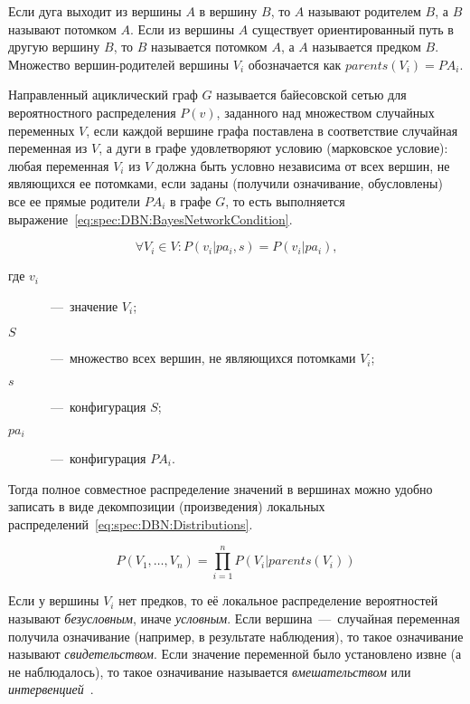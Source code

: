 Если дуга выходит из вершины $A$ в вершину $B$, то $A$ называют родителем $B$, а $B$ называют потомком $A$. Если из вершины $A$ существует ориентированный путь в другую вершину $B$, то $B$ называется потомком $A$, а $A$ называется предком $B$. Множество вершин-родителей вершины $V_i$ обозначается как $parents(V_i) = PA_i$.

Направленный ациклический граф $G$ называется байесовской сетью для вероятностного распределения $P(v)$, заданного над множеством случайных переменных $V$, если каждой вершине графа поставлена в соответствие случайная переменная из $V$, а дуги в графе удовлетворяют условию (марковское условие): любая переменная $V_i$ из $V$ должна быть условно независима от всех вершин, не являющихся ее потомками, если заданы (получили означивание, обусловлены) все ее прямые родители $PA_i$ в графе $G$, то есть выполняется выражение~\eqref{eq:spec:DBN:BayesNetworkCondition}.

\begin{equation} \label{eq:spec:DBN:BayesNetworkCondition}
\forall V_i\in V: P(v_i|pa_i, s) = P(v_i|pa_i) \text{,}
\end{equation}
\begin{description}
	\item[где $v_i$]~---~значение $V_i$;
	\item[$S$]~---~множество всех вершин, не являющихся потомками $V_i$;
	\item[$s$]~---~конфигурация $S$;
	\item[$pa_i$]~---~конфигурация $PA_i$.
\end{description}

Тогда полное совместное распределение значений в вершинах можно удобно записать в виде декомпозиции (произведения) локальных распределений~\eqref{eq:spec:DBN:Distributions}.

\begin{equation} \label{eq:spec:DBN:Distributions}
P(V_1,\dots,V_n) = \prod_{i=1}^{n} P(V_i|parents(V_i))
\end{equation}

Если у вершины $V_i$ нет предков, то её локальное распределение вероятностей называют \textit{безусловным}, иначе \textit{условным}. Если вершина~---~случайная переменная получила означивание (например, в результате наблюдения), то такое означивание называют \textit{свидетельством}. Если значение переменной было установлено извне (а не наблюдалось), то такое означивание называется \textit{вмешательством} или \textit{интервенцией}~\cite{PearlDynamicBayesianNetworks}.

